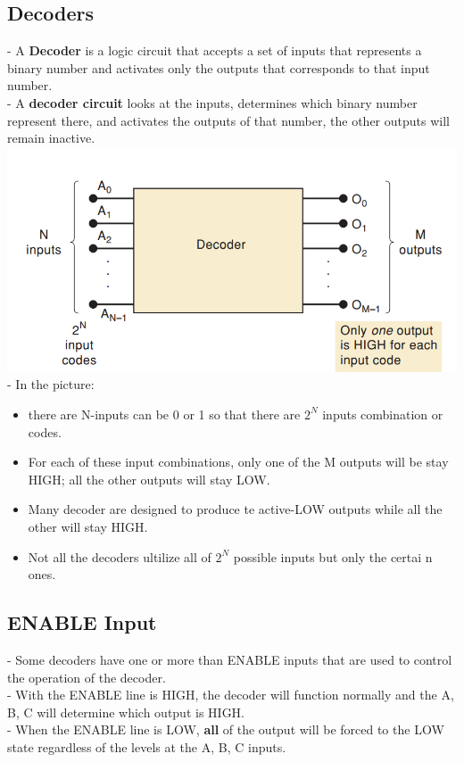 \documentclass[12pt]{article}
\begin{document}
\subsection{Decoders}
- A \textbf{Decoder} is a logic circuit that accepts a set of inputs that represents a binary number and activates only the outputs that corresponds to that input number. \\
- A \textbf{decoder circuit} looks at the inputs, determines which binary number represent there, and activates the outputs of that number, the other outputs will remain inactive. \\
\includegraphics[scale = 0.7]{hinh57}
\bigbreak
- In the picture: \\
\begin{itemize}
 \item there are N-inputs can be 0 or 1 so that there are $2^{N}$ inputs combination or codes.
 \item For each of these input combinations, only one of the M outputs will be stay HIGH; all the other outputs will stay LOW.
 \item Many decoder are designed to produce te active-LOW outputs while all the other will stay HIGH.
 \item Not all the decoders ultilize all of $2^{N}$ possible inputs but only the certai n ones.
 \end{itemize}
\subsection{ENABLE Input}
- Some decoders have one or more than ENABLE inputs that are used to control the operation of the decoder. \\
- With the ENABLE line is HIGH, the decoder will function normally and the A, B, C will determine which output is HIGH. \\
- When the ENABLE line is LOW, \textbf{all} of the output will be forced to the LOW state regardless of the levels at the A, B, C inputs. \\
\end{document}
